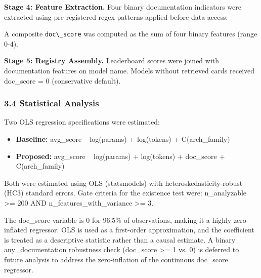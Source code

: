 \textbf{Stage 4: Feature Extraction.} Four binary documentation indicators were extracted using pre-registered regex patterns applied before data access:

\begin{table}[htbp]
\centering
{}
\end{table}

A composite \texttt{doc\textbackslash \_score} was computed as the sum of four binary features (range 0-4).

\textbf{Stage 5: Registry Assembly.} Leaderboard scores were joined with documentation features on model name. Models without retrieved cards received doc\_score = 0 (conservative default).

\subsubsection{3.4 Statistical Analysis}

Two OLS regression specifications were estimated:

\begin{itemize}
\item \textbf{Baseline:} avg\_score ~ log(params) + log(tokens) + C(arch\_family)
\item \textbf{Proposed:} avg\_score ~ log(params) + log(tokens) + doc\_score + C(arch\_family)
\end{itemize}

Both were estimated using OLS (statsmodels) with heteroskedasticity-robust (HC3) standard errors. Gate criteria for the existence test were: n\_analyzable >= 200 AND n\_features\_with\_variance >= 3.

The doc\_score variable is 0 for 96.5\% of observations, making it a highly zero-inflated regressor. OLS is used as a first-order approximation, and the coefficient is treated as a descriptive statistic rather than a causal estimate. A binary any\_documentation robustness check (doc\_score >= 1 vs. 0) is deferred to future analysis to address the zero-inflation of the continuous doc\_score regressor.
